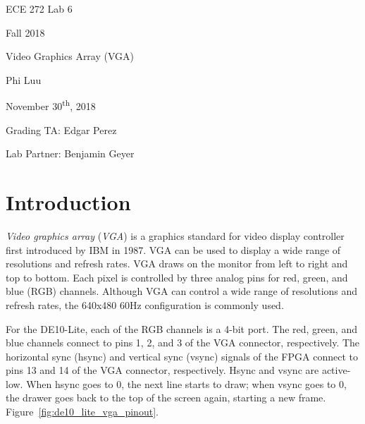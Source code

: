 \documentclass[12pt]{article}
\numberwithin{figure}{section}
\begin{document}
\begin{titlepage}
  \begin{center} \LARGE
    \vspace*{1.5in}

    ECE 272 Lab 6

    Fall 2018

    \vfill

    Video Graphics Array (VGA)

    Phi Luu

    \vfill

    November 30\textsuperscript{th}, 2018

    Grading TA: Edgar Perez

    Lab Partner: Benjamin Geyer

    \vspace{1.5in}
  \end{center}
\end{titlepage}

\section{Introduction}

\textit{Video graphics array} (\textit{VGA}) is a graphics standard for video display controller first introduced by IBM in 1987. VGA can be used to display a wide range of resolutions and refresh rates. VGA draws on the monitor from left to right and top to bottom. Each pixel is controlled by three analog pins for red, green, and blue (RGB) channels. Although VGA can control a wide range of resolutions and refresh rates, the 640x480 60Hz configuration is commonly used.

For the DE10-Lite, each of the RGB channels is a 4-bit port. The red, green, and blue channels connect to pins 1, 2, and 3 of the VGA connector, respectively. The horizontal sync (hsync) and vertical sync (vsync) signals of the FPGA connect to pins 13 and 14 of the VGA connector, respectively. Hsync and vsync are active-low. When hsync goes to 0, the next line starts to draw; when vsync goes to 0, the drawer goes back to the top of the screen again, starting a new frame. Figure~\ref{fig:de10_lite_vga_pinout}.
\end{document}
